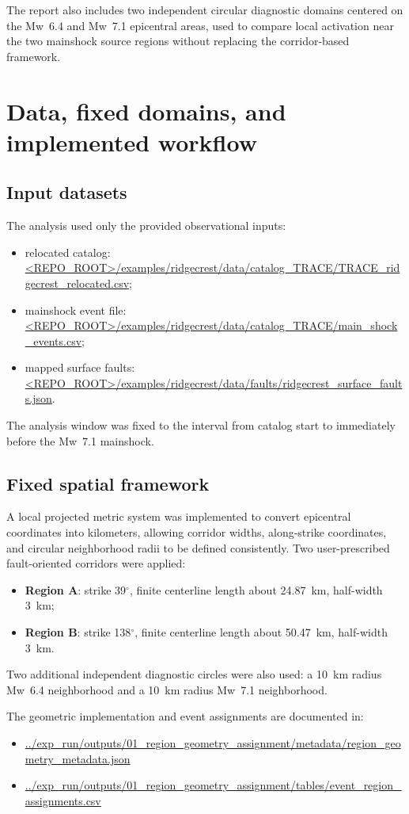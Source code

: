 \documentclass[11pt]{article}
\begin{document}
The report also includes two independent circular diagnostic domains centered on the Mw~6.4 and Mw~7.1 epicentral areas, used to compare local activation near the two mainshock source regions without replacing the corridor-based framework.

\section{Data, fixed domains, and implemented workflow}
\subsection{Input datasets}
The analysis used only the provided observational inputs:
\begin{itemize}
    \item relocated catalog: \url{<REPO_ROOT>/examples/ridgecrest/data/catalog_TRACE/TRACE_ridgecrest_relocated.csv};
    \item mainshock event file: \url{<REPO_ROOT>/examples/ridgecrest/data/catalog_TRACE/main_shock_events.csv};
    \item mapped surface faults: \url{<REPO_ROOT>/examples/ridgecrest/data/faults/ridgecrest_surface_faults.json}.
\end{itemize}
The analysis window was fixed to the interval from catalog start to immediately before the Mw~7.1 mainshock.

\subsection{Fixed spatial framework}
A local projected metric system was implemented to convert epicentral coordinates into kilometers, allowing corridor widths, along-strike coordinates, and circular neighborhood radii to be defined consistently. Two user-prescribed fault-oriented corridors were applied:
\begin{itemize}
    \item \textbf{Region A}: strike 39$^{\circ}$, finite centerline length about 24.87~km, half-width 3~km;
    \item \textbf{Region B}: strike 138$^{\circ}$, finite centerline length about 50.47~km, half-width 3~km.
\end{itemize}
Two additional independent diagnostic circles were also used: a 10~km radius Mw~6.4 neighborhood and a 10~km radius Mw~7.1 neighborhood.

The geometric implementation and event assignments are documented in:
\begin{itemize}
    \item \url{../exp_run/outputs/01_region_geometry_assignment/metadata/region_geometry_metadata.json}
    \item \url{../exp_run/outputs/01_region_geometry_assignment/tables/event_region_assignments.csv}
\end{itemize}
\end{document}
